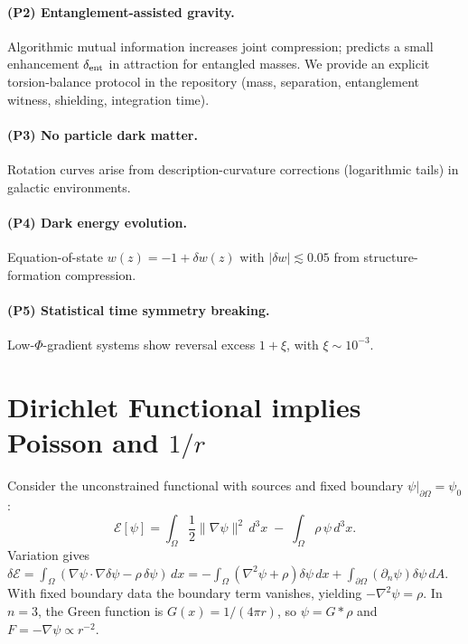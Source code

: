 \documentclass[aps,preprint,onecolumn,longbibliography,nofootinbib]{revtex4-2}
\numberwithin{equation}{section}        %
\begin{document}
\paragraph*{(P2) Entanglement-assisted gravity.}
Algorithmic mutual information increases joint compression; predicts a small enhancement $\delta_{\rm ent}$ in attraction for entangled masses. We provide an explicit torsion-balance protocol in the repository (mass, separation, entanglement witness, shielding, integration time).

\paragraph*{(P3) No particle dark matter.}
Rotation curves arise from description-curvature corrections (logarithmic tails) in galactic environments.

\paragraph*{(P4) Dark energy evolution.}
Equation-of-state $w(z)=-1+\delta w(z)$ with $|\delta w|\lesssim 0.05$ from structure-formation compression.

\paragraph*{(P5) Statistical time symmetry breaking.}
Low-$\Phi$-gradient systems show reversal excess $1+\xi$, with $\xi\sim 10^{-3}$.

\appendix

\section{Dirichlet Functional implies Poisson and $1/r$}\label{app:A}
Consider the unconstrained functional with sources and fixed boundary $\psi|_{\partial\Omega}=\psi_0$:
\begin{equation}
\mathcal{E}[\psi]=\int_{\Omega} \frac{1}{2}\|\nabla\psi\|^2\,d^3x \;-\; \int_{\Omega}\rho\,\psi\,d^3x. \label{eq:A1}
\end{equation}
Variation gives $\delta\mathcal E=\int_\Omega (\nabla\psi\cdot\nabla\delta\psi - \rho\,\delta\psi)\,dx
= -\int_\Omega (\nabla^2\psi + \rho)\delta\psi\,dx + \int_{\partial\Omega} (\partial_n\psi)\delta\psi\,dA$.
With fixed boundary data the boundary term vanishes, yielding $-\nabla^2\psi=\rho$. In $n=3$, the Green function is $G(x)=1/(4\pi r)$, so $\psi=G\ast \rho$ and $F=-\nabla\psi\propto r^{-2}$.
\end{document}
